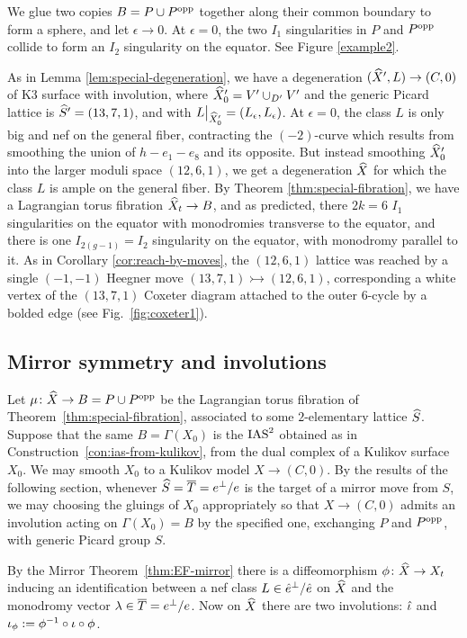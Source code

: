 \documentclass{amsart}
\begin{document}
\begin{example}[An $\ias$ for $\hS=(12,6,1)$]
We glue two copies $B= P\cup P^{\rm opp}$ together along their common
boundary to form a sphere, and let $\epsilon \to 0$. At $\epsilon=0$, 
the two $I_1$ singularities in $P$ and $P^{\rm opp}$ collide to form an $I_2$ singularity
on the equator. See Figure \ref{example2}.

As in Lemma \ref{lem:special-degeneration},
we have a degeneration $({\widehat X}',L)\to (C,0)$ of K3 surface with involution,
where ${\widehat X}_0' = V'\cup_{D'}V'$ and the generic Picard lattice is ${\widehat S}' = (13,7,1)$,
and with $L\big{|}_{{\widehat X}_0'}=(L_\epsilon,L_\epsilon)$. At $\epsilon=0$, the class $L$
is only big and nef on the general fiber, contracting the $(-2)$-curve which
results from smoothing the union of $h-e_1-e_8$ and its opposite. But
instead smoothing ${\widehat X}_0'$ into the larger moduli space $(12,6,1)$, we get a 
degeneration ${\widehat X}$ for which the class $L$ is ample on the general fiber.
By Theorem \ref{thm:special-fibration}, we have a Lagrangian torus fibration
${\widehat X}_t\to B$, and as predicted, there $2k=6$ $I_1$ singularities on the equator
with monodromies transverse to the equator, and there is one $I_{2(g-1)}=I_2$
singularity on the equator, with monodromy parallel to it.
As in Corollary \ref{cor:reach-by-moves}, the $(12,6,1)$ lattice was reached
by a single $(-1,-1)$ Heegner move $(13,7,1)\rightarrowtail (12,6,1)$, corresponding a white vertex
of the $(13,7,1)$ Coxeter diagram attached to the outer $6$-cycle by a bolded edge
(see Fig.~\ref{fig:coxeter1}).
 \end{example}

\subsection{Mirror symmetry and involutions}
\label{sec:mirror-involutions}

Let $\mu\colon {\widehat X}\to B=P\cup P^{\rm opp}$ be the Lagrangian torus fibration
of Theorem~\ref{thm:special-fibration}, associated to some $2$-elementary
lattice ${\widehat S}$. Suppose that the same 
$B=\Gamma(X_0)$ is the $\ias$ obtained as in
Construction~\ref{con:ias-from-kulikov}, from the dual complex
of a Kulikov surface $X_0$. We may smooth $X_0$ to a Kulikov model $X\to (C,0)$.
By the results of the following section, whenever ${\widehat S} = {\overline T} = e^\perp/e$
is the target of a mirror move from $S$, we may choosing the gluings
of $X_0$ appropriately so that $X\to (C,0)$ admits an involution
acting on $\Gamma(X_0)=B$ by the specified one,
exchanging $P$ and $P^{\rm opp}$, with generic Picard group $S$.

By the Mirror Theorem~\ref{thm:EF-mirror} there is a diffeomorphism
$\phi\colon{\widehat X} \to X_t$ inducing an identification between a nef 
class $L\in \hat e^\perp/\hat e$ on ${\widehat X}$ and the monodromy vector $\lambda\in{\overline T} = e^\perp/e$.  Now on
${\widehat X}$ there are two involutions: $\hat \iota$ and
$\iota_\phi:=\phi^{-1} \circ \iota \circ \phi$.
\end{document}
